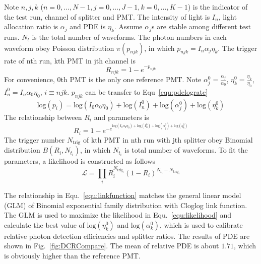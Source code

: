 Note $n,j,k$ ($n=0,...,N-1, j=0,...,J-1, k=0,...,K-1$) is the indicator of the test run, channel of splitter and PMT. The intensity of light is $I_n$, light allocation ratio is $\alpha_j$ and PDE is $\eta_k$. Assume $\alpha_j$s are stable among different test runs. $N_t$ is the total number of waveforms. The photon numbers in each waveform obey Poisson distribution $\pi(p_{njk})$, in which $p_{njk}=I_n\alpha_j\eta_k$. The trigger rate of nth run, kth PMT in jth channel is
\begin{equation}
    \label{equ:pderate}
    R_{njk}=1-e^{-p_{njk}}
\end{equation}
For convenience, 0th PMT is the only one reference PMT. Note $\alpha_j^0=\frac{\alpha_j}{\alpha_0}$, $\eta_k^0=\frac{\eta_k}{\eta_0}$, $I_n^0=I_n\alpha_0\eta_0$, $i\equiv njk$. $p_{njk}$ can be transfer to Equ~\eqref{equ:pdelograte}
\begin{equation}
    \label{equ:pdelograte}
    \mathrm{log}(p_{i})=\mathrm{log}(I_0\alpha_0\eta_0)+\mathrm{log}(I_n^0)+\mathrm{log}(\alpha_j^0)+\mathrm{log}(\eta_k^0)
\end{equation}
The relationship between $R_{i}$ and parameters is
\begin{equation}
    \label{equ:linkfunction}
    R_{i}=1-e^{-e^{\mathrm{log}(I_0\alpha_0\eta_0)+\mathrm{log}(I_n^0)+\mathrm{log}(\alpha_j^0)+\mathrm{log}(\eta_k^0)}}
\end{equation}
The trigger number $N_{\mathrm{trig}}$ of kth PMT in nth run with jth splitter obey Binomial distribution $B(R_{i},N_{t_{i}})$, in which $N_{t_{i}}$ is total number of waveforms. To fit the parameters, a likelihood is constructed as follows
\begin{equation}
    \label{equ:likelihood}
    \mathcal{L}=\prod_{i}{R_{i}^{N_{\mathrm{trig}_{i}}}(1-R_{i})^{N_{t_{i}}-N_{\mathrm{trig}_{i}}}}
\end{equation}

The relationship in Equ.~\eqref{equ:linkfunction} matches the general linear model (GLM) of Binomial exponential family distribution with Cloglog link function\cite{glm}. The GLM is used to maximize the likelihood in Equ.~\eqref{equ:likelihood} and calculate the best value of $\mathrm{log}(\eta_k^0)$ and $\mathrm{log}(\alpha_k^0)$, which is used to calibrate relative photon detection efficiencies and splitter ratios. The results of PDE are shown in Fig.~\ref{fig:DCRCompare}. The mean of relative PDE is about $1.71$, which is obviously higher than the reference PMT.

